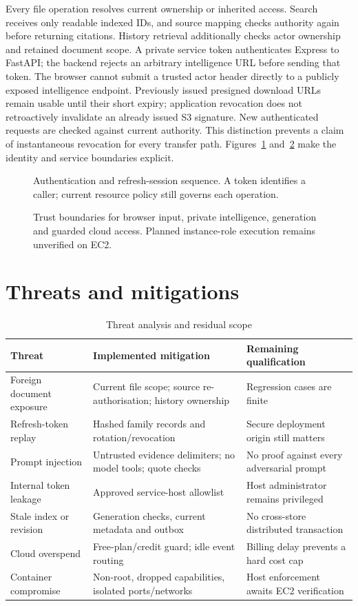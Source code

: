\documentclass[11pt,a4paper,oneside]{report}
\newcommand{\ShortCaption}[1]{\csname ShortCaption#1\endcsname}
\newcommand{\diagram}[3]{\par\begin{figure}[htbp]\centering\sbox{\DiagramBox}{}\ifdim\wd\DiagramBox>\linewidth\resizebox{\linewidth}{!}{\usebox{\DiagramBox}}\else\usebox{\DiagramBox}\fi\caption[\ShortCaption{#1}]{#2}\label{fig:#3}\end{figure}\par}
\begin{document}
Every file operation resolves current ownership or inherited access. Search receives only readable indexed IDs, and source mapping checks authority again before returning citations. History retrieval additionally checks actor ownership and retained document scope. A private service token authenticates Express to FastAPI; the backend rejects an arbitrary intelligence URL before sending that token. The browser cannot submit a trusted actor header directly to a publicly exposed intelligence endpoint.
Previously issued presigned download URLs remain usable until their short expiry; application revocation does not retroactively invalidate an already issued S3 signature. New authenticated requests are checked against current authority. This distinction prevents a claim of instantaneous revocation for every transfer path.
Figures~\ref{fig:auth} and~\ref{fig:trust} make the identity and service boundaries explicit.
\diagram{authentication}{Authentication and refresh-session sequence. A token identifies a caller; current resource policy still governs each operation.}{auth}
\diagram{trust}{Trust boundaries for browser input, private intelligence, generation and guarded cloud access. Planned instance-role execution remains unverified on EC2.}{trust}
\section{Threats and mitigations}
\par\begin{table}[htbp]\caption{Threat analysis and residual scope}\small\begin{tabularx}{\linewidth}{p{.25\linewidth}YY}\toprule Threat&Implemented mitigation&Remaining qualification\\\midrule
Foreign document exposure&Current file scope; source re-authorisation; history ownership&Regression cases are finite\\
Refresh-token replay&Hashed family records and rotation/revocation&Secure deployment origin still matters\\
Prompt injection&Untrusted evidence delimiters; no model tools; quote checks&No proof against every adversarial prompt\\
Internal token leakage&Approved service-host allowlist&Host administrator remains privileged\\
Stale index or revision&Generation checks, current metadata and outbox&No cross-store distributed transaction\\
Cloud overspend&Free-plan/credit guard; idle event routing&Billing delay prevents a hard cost cap\\
Container compromise&Non-root, dropped capabilities, isolated ports/networks&Host enforcement awaits EC2 verification\\\bottomrule\end{tabularx}\end{table}\par
\end{document}
